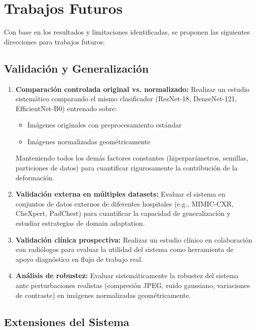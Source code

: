 \section{Trabajos Futuros}
\label{sec:trabajos_futuros}

Con base en los resultados y limitaciones identificadas, se proponen las siguientes direcciones para trabajos futuros:

\subsection{Validación y Generalización}
\label{subsec:trabajos_futuros_validacion}

\begin{enumerate}
    \item \textbf{Comparación controlada original vs. normalizado:} Realizar un estudio sistemático comparando el mismo clasificador (ResNet-18, DenseNet-121, EfficientNet-B0) entrenado sobre:
    \begin{itemize}
        \item Imágenes originales con preprocesamiento estándar
        \item Imágenes normalizadas geométricamente
    \end{itemize}
    Manteniendo todos los demás factores constantes (hiperparámetros, semillas, particiones de datos) para cuantificar rigurosamente la contribución de la deformación.

    \item \textbf{Validación externa en múltiples datasets:} Evaluar el sistema en conjuntos de datos externos de diferentes hospitales (e.g., MIMIC-CXR, CheXpert, PadChest) para cuantificar la capacidad de generalización y estudiar estrategias de domain adaptation.

    \item \textbf{Validación clínica prospectiva:} Realizar un estudio clínico en colaboración con radiólogos para evaluar la utilidad del sistema como herramienta de apoyo diagnóstico en flujo de trabajo real.

    \item \textbf{Análisis de robustez:} Evaluar sistemáticamente la robustez del sistema ante perturbaciones realistas (compresión JPEG, ruido gaussiano, variaciones de contraste) en imágenes normalizadas geométricamente.
\end{enumerate}

\subsection{Extensiones del Sistema}
\label{subsec:trabajos_futuros_extensiones}

